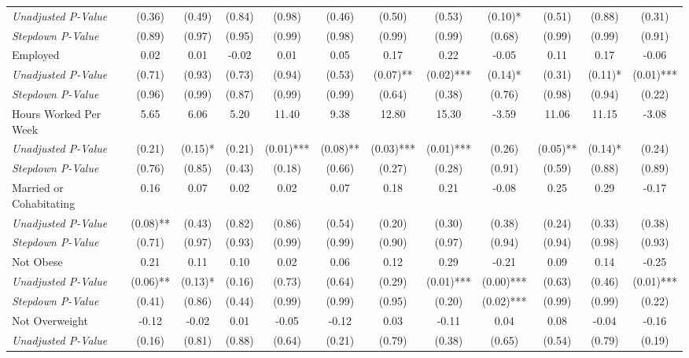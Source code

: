 \begin{tabular}{l c c c c c c c c c c c}
\quad \textit{Unadjusted P-Value} & (0.36) & (0.49) & (0.84) & (0.98) & (0.46) & (0.50) & (0.53) & (0.10)* & (0.51) & (0.88) & (0.31) \\
\quad \textit{Stepdown P-Value} & (0.89) & (0.97) & (0.95) & (0.99) & (0.98) & (0.99) & (0.99) & (0.68) & (0.99) & (0.99) & (0.91) \\
Employed & 0.02 & 0.01 & -0.02 & 0.01 & 0.05 & 0.17 & 0.22 & -0.05 & 0.11 & 0.17 & -0.06 \\
\quad \textit{Unadjusted P-Value} & (0.71) & (0.93) & (0.73) & (0.94) & (0.53) & (0.07)** & (0.02)*** & (0.14)* & (0.31) & (0.11)* & (0.01)*** \\
\quad \textit{Stepdown P-Value} & (0.96) & (0.99) & (0.87) & (0.99) & (0.99) & (0.64) & (0.38) & (0.76) & (0.98) & (0.94) & (0.22) \\
Hours Worked Per Week & 5.65 & 6.06 & 5.20 & 11.40 & 9.38 & 12.80 & 15.30 & -3.59 & 11.06 & 11.15 & -3.08 \\
\quad \textit{Unadjusted P-Value} & (0.21) & (0.15)* & (0.21) & (0.01)*** & (0.08)** & (0.03)*** & (0.01)*** & (0.26) & (0.05)** & (0.14)* & (0.24) \\
\quad \textit{Stepdown P-Value} & (0.76) & (0.85) & (0.43) & (0.18) & (0.66) & (0.27) & (0.28) & (0.91) & (0.59) & (0.88) & (0.89) \\
Married or Cohabitating & 0.16 & 0.07 & 0.02 & 0.02 & 0.07 & 0.18 & 0.21 & -0.08 & 0.25 & 0.29 & -0.17 \\
\quad \textit{Unadjusted P-Value} & (0.08)** & (0.43) & (0.82) & (0.86) & (0.54) & (0.20) & (0.30) & (0.38) & (0.24) & (0.33) & (0.38) \\
\quad \textit{Stepdown P-Value} & (0.71) & (0.97) & (0.93) & (0.99) & (0.99) & (0.90) & (0.97) & (0.94) & (0.94) & (0.98) & (0.93) \\
Not Obese & 0.21 & 0.11 & 0.10 & 0.02 & 0.06 & 0.12 & 0.29 & -0.21 & 0.09 & 0.14 & -0.25 \\
\quad \textit{Unadjusted P-Value} & (0.06)** & (0.13)* & (0.16) & (0.73) & (0.64) & (0.29) & (0.01)*** & (0.00)*** & (0.63) & (0.46) & (0.01)*** \\
\quad \textit{Stepdown P-Value} & (0.41) & (0.86) & (0.44) & (0.99) & (0.99) & (0.95) & (0.20) & (0.02)*** & (0.99) & (0.99) & (0.22) \\
Not Overweight & -0.12 & -0.02 & 0.01 & -0.05 & -0.12 & 0.03 & -0.11 & 0.04 & 0.08 & -0.04 & -0.16 \\
\quad \textit{Unadjusted P-Value} & (0.16) & (0.81) & (0.88) & (0.64) & (0.21) & (0.79) & (0.38) & (0.65) & (0.54) & (0.79) & (0.19) \\

\end{tabular}
